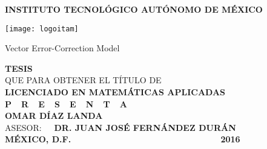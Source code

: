 \begin{titlepage}
    \begin{center}
        
        \vspace{0.2cm}

        \large
        \textbf{INSTITUTO TECNOLÓGICO AUTÓNOMO DE MÉXICO}

        \vspace{1.2cm}
        
        \texttt{[image: logoitam]}
        
        \vspace{0.8cm}
        \LARGE
        Vector Error-Correction Model
        
        \vspace{1.1cm}
        
        \normalsize \textbf{TESIS}\\ QUE PARA OBTENER EL TÍTULO DE\\ \textbf{LICENCIADO EN MATEMÁTICAS APLICADAS}\\[0.8cm]
        \normalsize \textbf{P\ \  R\ \  E\ \  S\ \  E\ \  N\ \  T\ \  A}\\[0.8cm]

        \textbf{OMAR DÍAZ LANDA}\\[1.0cm]

        \normalsize ASESOR: \textbf{\ \ DR. JUAN JOSÉ FERNÁNDEZ DURÁN}\\[1.0cm]

        \normalsize \textbf{MÉXICO, D.F.} {\ \ \ \ \ \ \ \ \ \ \ \ \ \ \ \ \ \ \ \ \ \ \ \ \ \ \ \ \ \ \ \ \ \ } \textbf{2016}
    \end{center}
\end{titlepage}